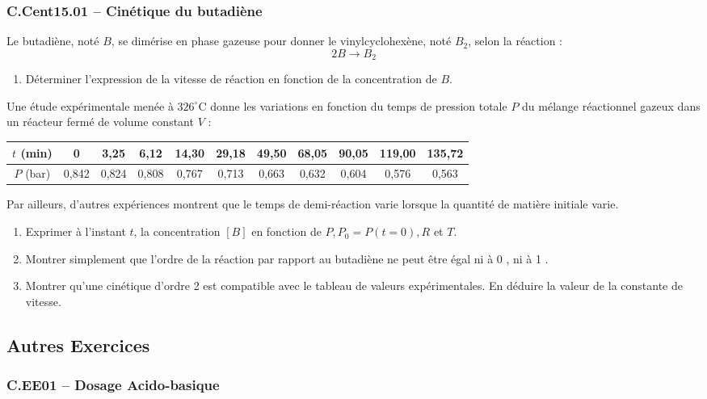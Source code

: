 \newpage
\subsubsection*{C.Cent15.01 -- Cinétique du butadiène  \lesdeux}

Le butadiène, noté $B$, se dimérise en phase gazeuse pour donner le vinylcyclohexène, noté $B_2$, selon la réaction :
\[
2 B \rightarrow B_2
\]
\begin{enumerate}
    \item Déterminer l'expression de la vitesse de réaction en fonction de la concentration de $B$.
\end{enumerate}

Une étude expérimentale menée à $326^{\circ} \mathrm{C}$ donne les variations en fonction du temps de pression totale $P$ du mélange réactionnel gazeux dans un réacteur fermé de volume constant $V$ :

\begin{center}
\begin{tabular}{|c|c|c|c|c|c|c|c|c|c|c|}
\hline$t$ (min) & 0 & 3,25 & 6,12 & 14,30 & 29,18 & 49,50 & 68,05 & 90,05 & 119,00 & 135,72 \\
\hline$P$ (bar) & 0,842 & 0,824 & 0,808 & 0,767 & 0,713 & 0,663 & 0,632 & 0,604 & 0,576 & 0,563 \\
\hline
\end{tabular}
\end{center}

Par ailleurs, d'autres expériences montrent que le temps de demi-réaction varie lorsque la quantité de matière initiale varie.

\begin{enumerate}[resume]
\item Exprimer à l'instant $t$, la concentration $[B]$ en fonction de $P, P_0=P(t=0), R$ et $T$.
\item Montrer simplement que l'ordre de la réaction par rapport au butadiène ne peut être égal ni à 0 , ni à 1 .
\item Montrer qu'une cinétique d'ordre 2 est compatible avec le tableau de valeurs expérimentales. En déduire la valeur de la constante de vitesse.
\end{enumerate}

\newpage
\subsection*{Autres Exercices}
\subsubsection*{C.EE01 -- Dosage Acido-basique  \corrige}

